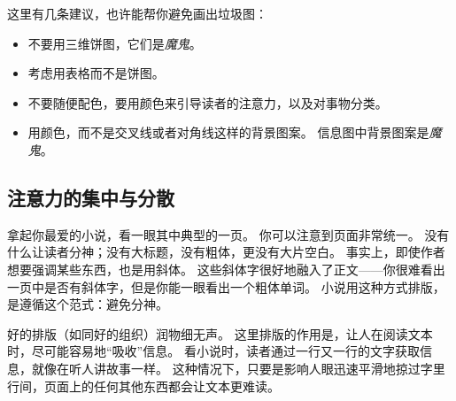 这里有几条建议，也许能帮你避免画出垃圾图：

\eohs

\begin{itemize}
\item
  不要用三维饼图，它们是\emph{魔鬼}。
\item
  考虑用表格而不是饼图。
\item
  不要随便配色，要用颜色来引导读者的注意力，以及对事物分类。
\item
  用颜色，而不是交叉线或者对角线这样的背景图案。
  信息图中背景图案是\emph{魔鬼}。
\end{itemize}


\subsection{注意力的集中与分散}


\bohs

拿起你最爱的小说，看一眼其中典型的一页。
你可以注意到页面非常统一。
没有什么让读者分神；没有大标题，没有粗体，更没有大片空白。
事实上，即使作者想要强调某些东西，也是用斜体。
这些斜体字很好地融入了正文——你很难看出一页中是否有斜体字，但是你能一眼看出一个粗体单词。
小说用这种方式排版，是遵循这个范式：避免分神。

好的排版（如同好的组织）润物细无声。
这里排版的作用是，让人在阅读文本时，尽可能容易地“吸收”信息。
看小说时，读者通过一行又一行的文字获取信息，就像在听人讲故事一样。
这种情况下，只要是影响人眼迅速平滑地掠过字里行间，页面上的任何其他东西都会让文本更难读。


